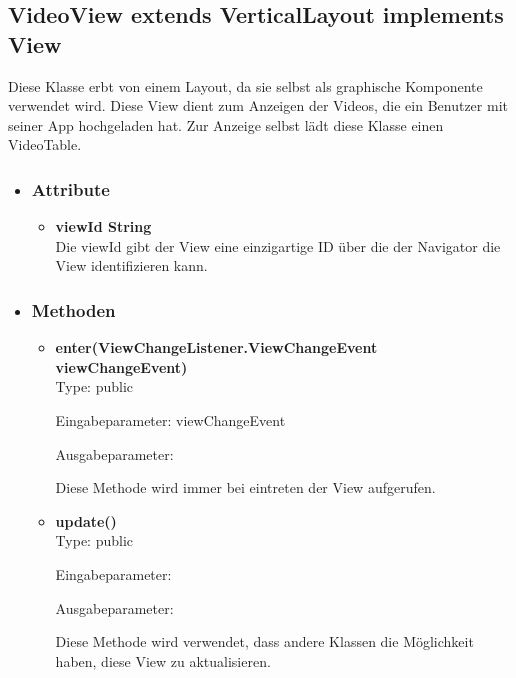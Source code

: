 \newpage
\subsection{VideoView extends VerticalLayout implements View}
Diese Klasse erbt von einem Layout, da sie selbst als graphische Komponente verwendet wird. Diese View dient zum Anzeigen der Videos, die ein Benutzer mit seiner App hochgeladen hat. Zur Anzeige selbst lädt diese Klasse einen VideoTable.

\begin{itemize}
\item \subsubsection{Attribute}
\begin{itemize}
\item \textbf{viewId String} \hfill\\ 
Die viewId gibt der View eine einzigartige ID über die der Navigator die View identifizieren kann.

\end{itemize}

\item \subsubsection{Methoden}
\begin{itemize}
\item \textbf{enter(ViewChangeListener.ViewChangeEvent viewChangeEvent)}\hfill\\
Type: public

Eingabeparameter: viewChangeEvent

Ausgabeparameter:

Diese Methode wird immer bei eintreten der View aufgerufen.



\item \textbf{update()} \hfill\\ 
Type: public

Eingabeparameter:

Ausgabeparameter:

Diese Methode wird verwendet, dass andere Klassen die Möglichkeit haben, diese View zu aktualisieren.
\end{itemize}

\end{itemize}